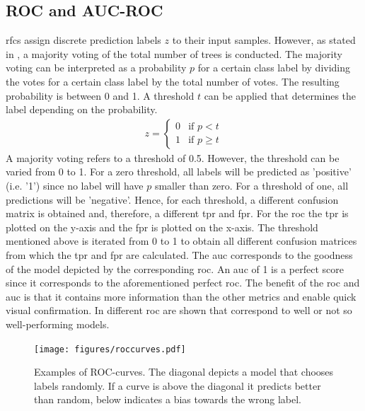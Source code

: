 \subsection{ROC and AUC-ROC}\label{sec:rocauc}
\acp{rfc} assign discrete prediction labels $z$ to their input samples. However, as stated in , a majority voting of the total number of trees is conducted. The majority voting can be interpreted as a probability $p$ for a certain class label by dividing the votes for a certain class label by the total number of votes. The resulting probability is between 0 and 1. A threshold $t$ can be applied that determines the label depending on the probability.
\begin{align}
z =  
\begin{cases}
0 & \text{if } p<t\\
1 & \text{if } p\geq t
\end{cases}
\end{align}
A majority voting refers to a threshold of \num{0.5}. However, the threshold can be varied from 0 to 1. For a zero threshold, all labels will be predicted as 'positive' (i.e. '1') since no label will have $p$ smaller than zero. For a threshold of one, all predictions will be 'negative'. Hence, for each threshold, a different confusion matrix is obtained and, therefore, a different \ac{tpr} and \ac{fpr}. For the \ac{roc} the \ac{tpr} is plotted on the y-axis and the \ac{fpr} is plotted on the x-axis. The threshold mentioned above is iterated from 0 to 1 to obtain all different confusion matrices from which the \ac{tpr} and \ac{fpr} are calculated. The \ac{auc} corresponds to the goodness of the model depicted by the corresponding \ac{roc}. An \ac{auc} of \num{1} is a perfect score since it corresponds to the aforementioned perfect \ac{roc}. The benefit of the \ac{roc} and \ac{auc} is that it contains more information than the other metrics and enable quick visual confirmation.\cite{Fawcett2006} In  different \ac{roc} are shown that correspond to well or not so well-performing models.
\begin{figure}[H]
	\centering
	\texttt{[image: figures/roccurves.pdf]}
	\caption[Examples of ROC-Curves]{Examples of ROC-curves. The diagonal depicts a model that chooses labels randomly. If a curve is above the diagonal it predicts better than random, below indicates a bias towards the wrong label.}
	\label{fig:roccurves}
\end{figure}
%
%
